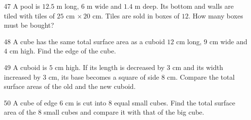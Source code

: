 \gap
\begin{probbox}{47}{}
A pool is $12.5$ m long, $6$ m wide and $1.4$ m deep. Its bottom and walls are tiled with tiles of $25$ cm $\times\,20$ cm. Tiles are sold in boxes of $12$. How many boxes must be bought?
\end{probbox}
\gap
\begin{probbox}{48}{}
A cube has the same total surface area as a cuboid $12$ cm long, $9$ cm wide and $4$ cm high. Find the edge of the cube.
\end{probbox}
\gap
\begin{probbox}{49}{}
A cuboid is $5$ cm high. If its length is decreased by $3$ cm and its width increased by $3$ cm, its base becomes a square of side $8$ cm. Compare the total surface areas of the old and the new cuboid.
\end{probbox}
\gap
\begin{probbox}{50}{}
A cube of edge $6$ cm is cut into $8$ equal small cubes. Find the total surface area of the $8$ small cubes and compare it with that of the big cube.
\end{probbox}
